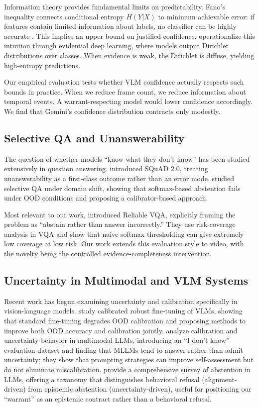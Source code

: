 \documentclass{article}
\begin{document}
Information theory provides fundamental limits on predictability. Fano's inequality connects conditional entropy $H(Y|X)$ to minimum achievable error: if features contain limited information about labels, no classifier can be highly accurate \citep{fano1961transmission}. This implies an upper bound on justified confidence. \citet{sensoy2018evidential} operationalize this intuition through evidential deep learning, where models output Dirichlet distributions over classes. When evidence is weak, the Dirichlet is diffuse, yielding high-entropy predictions.

Our empirical evaluation tests whether VLM confidence actually respects such bounds in practice. When we reduce frame count, we reduce information about temporal events. A warrant-respecting model would lower confidence accordingly. We find that Gemini's confidence distribution contracts only modestly.

\subsection{Selective QA and Unanswerability}

The question of whether models ``know what they don't know'' has been studied extensively in question answering. \citet{rajpurkar2018squad2} introduced SQuAD 2.0, treating unanswerability as a first-class outcome rather than an error mode. \citet{kamath2020selective} studied selective QA under domain shift, showing that softmax-based abstention fails under OOD conditions and proposing a calibrator-based approach.

Most relevant to our work, \citet{whitehead2022reliable} introduced Reliable VQA, explicitly framing the problem as ``abstain rather than answer incorrectly.'' They use risk-coverage analysis in VQA and show that naive softmax thresholding can give extremely low coverage at low risk. Our work extends this evaluation style to video, with the novelty being the controlled evidence-completeness intervention.

\subsection{Uncertainty in Multimodal and VLM Systems}

Recent work has begun examining uncertainty and calibration specifically in vision-language models. \citet{oh2024calibrated} study calibrated robust fine-tuning of VLMs, showing that standard fine-tuning degrades OOD calibration and proposing methods to improve both OOD accuracy and calibration jointly. \citet{chen2024calibration} analyze calibration and uncertainty behavior in multimodal LLMs, introducing an ``I don't know'' evaluation dataset and finding that MLLMs tend to answer rather than admit uncertainty; they show that prompting strategies can improve self-assessment but do not eliminate miscalibration. \citet{wen2025abstention} provide a comprehensive survey of abstention in LLMs, offering a taxonomy that distinguishes behavioral refusal (alignment-driven) from epistemic abstention (uncertainty-driven), useful for positioning our ``warrant'' as an epistemic contract rather than a behavioral refusal.
\end{document}
